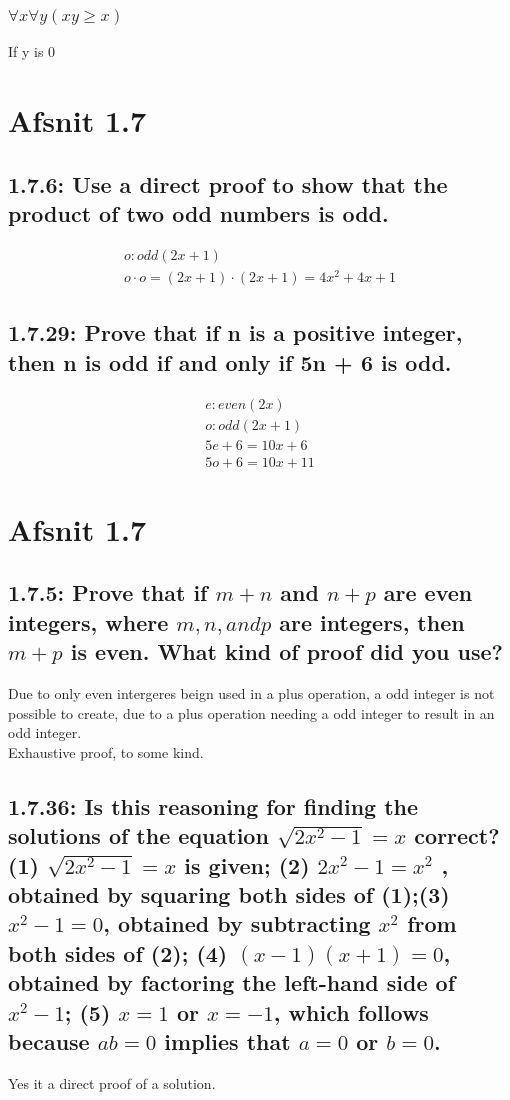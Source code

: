 \documentclass[12pt, a4paper]{report}
\begin{document}
				\subsubsection{$\forall x \forall y (xy \geq x)$}
					If y is 0
		\section{Afsnit 1.7}
			\setcounter{subsection}{5}
			\subsection{1.7.6: Use a direct proof to show that the product of two odd numbers is odd.}
				\begin{align*}
					o: odd(2x+1)\\
					o\cdot o=(2x+1)\cdot(2x+1)=4x^2+4x+1
				\end{align*}
			\setcounter{subsection}{28}
				\subsection{1.7.29: Prove that if n is a positive integer, then n is odd if and only if 5n + 6 is odd.}
					\begin{align*}
						e: even(2x)\\
						o: odd(2x+1)\\
						5e+6=10x+6\\
						5o+6=10x+11
					\end{align*}
		\setcounter{section}{0}
		\section{Afsnit 1.7}
			\setcounter{subsection}{4}
			\subsection{1.7.5: Prove that if $m + n$ and $n + p$ are even integers, where $m, n, and p$ are integers, then $m + p$ is even. What kind of proof did you use?}
				Due to only even intergeres beign used in a plus operation, a odd integer is not possible to create, due to a plus operation needing a odd integer to result in an odd integer.\\
				Exhaustive proof, to some kind.
			\setcounter{subsection}{35}
			\subsection{1.7.36: Is this reasoning for ﬁnding the solutions of the equation $\sqrt{2x^2 - 1} = x$ correct? (1) $\sqrt{2x^2 - 1} = x$ is given; (2) $2x^2 - 1 = x^2$ , obtained by squaring both sides of (1);(3) $x^2 - 1 = 0$, obtained by subtracting $x^2$ from both sides of (2); (4) $(x - 1)(x + 1) = 0$, obtained by factoring the left-hand side of $x^2 - 1$; (5) $x = 1$ or $x = -1$, which follows because $ab = 0$ implies that $a = 0$ or $b = 0$.}
				Yes it a direct proof of a solution.
			\setcounter{subsection}{42}
\end{document}
